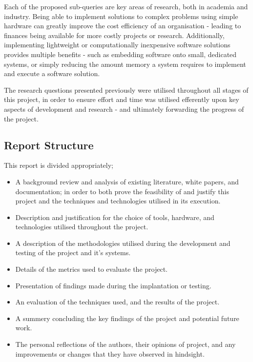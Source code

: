 Each of the proposed sub-queries are key areas of research, both in academia
and industry.
Being able to implement solutions to complex problems using simple hardware
can greatly improve the cost efficiency of an organisation - leading to
finances being available for more costly projects or research. 
Additionally, implementing lightweight or computationally inexpensive software
solutions provides multiple benefits - such as embedding software onto small,
dedicated systems, or simply reducing the amount memory a system requires to
implement and execute a software solution. 

The research questions presented previously were utilised throughout all
stages of this project, in order to ensure effort and time was utilised
efferently upon key aspects of development and research - and ultimately
forwarding the progress of the project.

\subsection{Report Structure}
This report is divided appropriately;

\begin{itemize}

\item A background review and analysis of existing literature, white papers, and
documentation; in order to both prove the feasibility of and justify this
project and the techniques and technologies utilised in its execution.

\item Description and justification for the choice of tools, hardware, and
technologies utilised throughout the project.

\item A description of the methodologies utilised during the
development and testing of the project and it's systems.

\item Details of the metrics used to evaluate the project.

\item Presentation of findings made during the implantation or testing.

\item An evaluation of the techniques used, and the results of the project.

\item A summery concluding the key findings of the project and potential future
work.

\item The personal reflections of the authors, their opinions of project, and
any improvements or changes that they have observed in hindsight.

\end{itemize}
